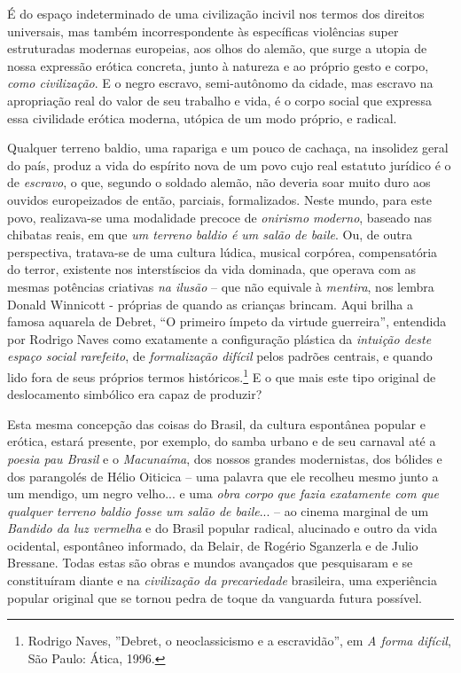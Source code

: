 É do espaço indeterminado de uma civilização incivil nos termos dos
direitos universais, mas também incorrespondente às específicas
violências super estruturadas modernas europeias, aos olhos do alemão,
que surge a utopia de nossa expressão erótica concreta, junto à natureza
e ao próprio gesto e corpo, \emph{como civilização}. E o negro escravo,
semi-autônomo da cidade, mas escravo na apropriação real do valor de seu
trabalho e vida, é o corpo social que expressa essa civilidade erótica
moderna, utópica de um modo próprio, e radical.

Qualquer terreno baldio, uma rapariga e um pouco de cachaça, na
insolidez geral do país, produz a vida do espírito nova de um povo cujo
real estatuto jurídico é o de \emph{escravo}, o que, segundo o soldado
alemão, não deveria soar muito duro aos ouvidos europeizados de então,
parciais, formalizados. Neste mundo, para este povo, realizava-se uma
modalidade precoce de \emph{onirismo} \emph{moderno}, baseado nas
chibatas reais, em que \emph{um terreno baldio é um salão de baile}. Ou,
de outra perspectiva, tratava-se de uma cultura lúdica, musical
corpórea, compensatória do terror, existente nos interstíscios da vida
dominada, que operava com as mesmas potências criativas \emph{na ilusão}
-- que não equivale à \emph{mentira}, nos lembra Donald Winnicott -
próprias de quando as crianças brincam. Aqui brilha a famosa aquarela de
Debret, ``O primeiro ímpeto da virtude guerreira'', entendida por
Rodrigo Naves como exatamente a configuração plástica da \emph{intuição
deste espaço social rarefeito}, de \emph{formalização difícil} pelos
padrões centrais, e quando lido fora de seus próprios termos
históricos.\footnote{Rodrigo Naves, ''Debret, o neoclassicismo e a
  escravidão'', em \emph{A forma difícil}, São Paulo: Ática, 1996.} E o
que mais este tipo original de deslocamento simbólico era capaz de
produzir?

Esta mesma concepção das coisas do Brasil, da cultura espontânea popular
e erótica, estará presente, por exemplo, do samba urbano e de seu
carnaval até a \emph{poesia pau Brasil} e o \emph{Macunaíma}, dos nossos
grandes modernistas, dos bólides e dos parangolés de Hélio Oiticica --
uma palavra que ele recolheu mesmo junto a um mendigo, um negro velho...
e uma \emph{obra corpo} \emph{que fazia exatamente com que qualquer
terreno baldio fosse um salão de baile}... -- ao cinema marginal de um
\emph{Bandido da luz vermelha} e do Brasil popular radical, alucinado e
outro da vida ocidental, espontâneo informado, da Belair, de Rogério
Sganzerla e de Julio Bressane. Todas estas são obras e mundos avançados
que pesquisaram e se constituíram diante e na \emph{civilização da
precariedade} brasileira, uma experiência popular original que se tornou
pedra de toque da vanguarda futura possível.

